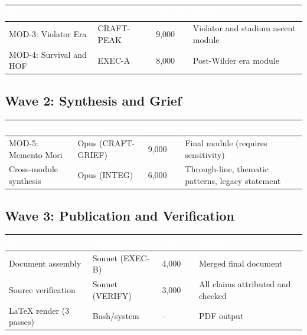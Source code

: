 \documentclass[11pt,letterpaper]{article}
\newcommand{\tableheader}[1]{\textbf{\sffamily\textcolor{white}{#1}}}
\begin{document}
\begin{center}
\begin{tabularx}{\textwidth}{L{3.5cm}L{2cm}C{1.5cm}X}
\toprule
{}
\tableheader{Task} & \tableheader{Agent} & \tableheader{Tokens} & \tableheader{Output} \\
\midrule
MOD-3: Violator Era & CRAFT-PEAK & 9,000 & Violator and stadium ascent module \\
MOD-4: Survival and HOF & EXEC-A & 8,000 & Post-Wilder era module \\
\bottomrule
\end{tabularx}
\end{center}

\subsection{Wave 2: Synthesis and Grief}

\begin{center}
\begin{tabularx}{\textwidth}{L{4cm}L{2cm}C{1.5cm}X}
\toprule
{}
\tableheader{Task} & \tableheader{Agent} & \tableheader{Tokens} & \tableheader{Output} \\
\midrule
MOD-5: Memento Mori & Opus (CRAFT-GRIEF) & 9,000 & Final module (requires sensitivity) \\
Cross-module synthesis & Opus (INTEG) & 6,000 & Through-line, thematic patterns, legacy statement \\
\bottomrule
\end{tabularx}
\end{center}

\subsection{Wave 3: Publication and Verification}

\begin{center}
\begin{tabularx}{\textwidth}{L{4cm}L{2cm}C{1.5cm}X}
\toprule
{}
\tableheader{Task} & \tableheader{Agent} & \tableheader{Tokens} & \tableheader{Output} \\
\midrule
Document assembly & Sonnet (EXEC-B) & 4,000 & Merged final document \\
Source verification & Sonnet (VERIFY) & 3,000 & All claims attributed and checked \\
LaTeX render (3 passes) & Bash/system & -- & PDF output \\
\bottomrule
\end{tabularx}
\end{center}
\end{document}
